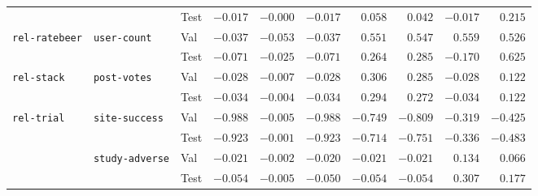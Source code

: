 \begin{tabular}{lllrrrrrrr}
 &  & Test & $-0.017$ & $-0.000$ & $-0.017$ & $0.058$ & $0.042$ & $-0.017$ & $\bm{0.215}$ \\
\cmidrule{1-10} \cmidrule{2-10}
\multirow[c]{2}{*}{\texttt{rel-ratebeer}} & \multirow[c]{2}{*}{\texttt{user-count}} & Val & $-0.037$ & $-0.053$ & $-0.037$ & $0.551$ & $0.547$ & $\bm{0.559}$ & $0.526$ \\
 &  & Test & $-0.071$ & $-0.025$ & $-0.071$ & $0.264$ & $0.285$ & $-0.170$ & $\bm{0.625}$ \\
\cmidrule{1-10} \cmidrule{2-10}
\multirow[c]{2}{*}{\texttt{rel-stack}} & \multirow[c]{2}{*}{\texttt{post-votes}} & Val & $-0.028$ & $-0.007$ & $-0.028$ & $\bm{0.306}$ & $0.285$ & $-0.028$ & $0.122$ \\
 &  & Test & $-0.034$ & $-0.004$ & $-0.034$ & $\bm{0.294}$ & $0.272$ & $-0.034$ & $0.122$ \\
\cmidrule{1-10} \cmidrule{2-10}
\multirow[c]{4}{*}{\texttt{rel-trial}} & \multirow[c]{2}{*}{\texttt{site-success}} & Val & $-0.988$ & $\bm{-0.005}$ & $-0.988$ & $-0.749$ & $-0.809$ & $-0.319$ & $-0.425$ \\
 &  & Test & $-0.923$ & $\bm{-0.001}$ & $-0.923$ & $-0.714$ & $-0.751$ & $-0.336$ & $-0.483$ \\
\cmidrule{2-10}
 & \multirow[c]{2}{*}{\texttt{study-adverse}} & Val & $-0.021$ & $-0.002$ & $-0.020$ & $-0.021$ & $-0.021$ & $\bm{0.134}$ & $0.066$ \\
 &  & Test & $-0.054$ & $-0.005$ & $-0.050$ & $-0.054$ & $-0.054$ & $\bm{0.307}$ & $0.177$ \\
\bottomrule
\end{tabular}

